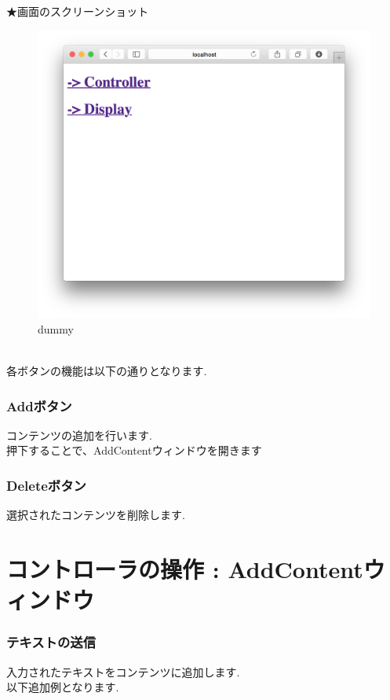 \documentclass[a4paper,10pt,oneside]{jsbook}
\begin{document}
★画面のスクリーンショット
\begin{figure}[htbp]
	\begin{center}
		\includegraphics[width=11.5cm]{image/home.png}
	\end{center}
	\caption{dummy}
	\label{fig:home}
\end{figure}
\\

各ボタンの機能は以下の通りとなります.\\

\subsection{Addボタン}
コンテンツの追加を行います.\\
押下することで、AddContentウィンドウを開きます



\subsection{Deleteボタン}
選択されたコンテンツを削除します.\\

\chapter{コントローラの操作 : AddContentウィンドウ}
\subsection{テキストの送信}
入力されたテキストをコンテンツに追加します.\\
以下追加例となります.\\
\\
\end{document}
